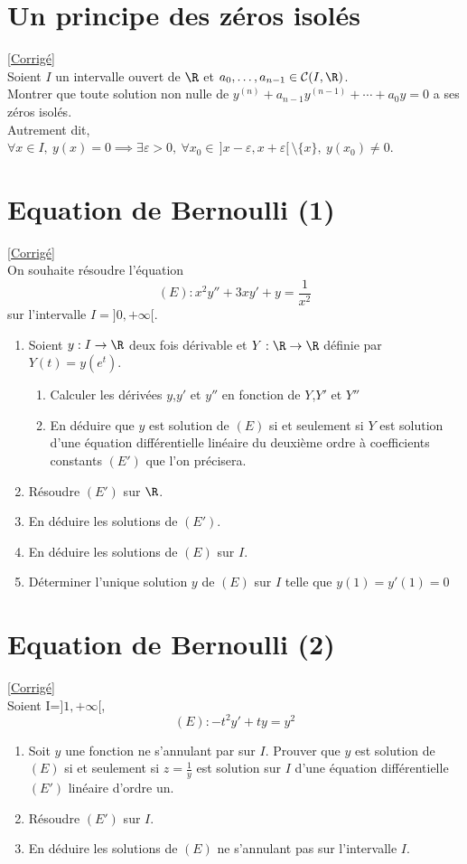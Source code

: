 \documentclass{book}
\begin{document}
\section{Un principe des zéros isolés }
\textcolor{blue}{\hyperref[Un principe des zéros isolés corrigé]{[Corrigé]}}\\
\label{Un principe des zéros isolés}
Soient $I$ un intervalle ouvert de $\R$ et $a_0,\dots,a_{n-1}\in \mathcal C(I,\R)$.\\
Montrer que toute solution non nulle de $y^{(n)}+a_{n-1}y^{(n-1)}+\cdots+a_0y=0$ a ses zéros isolés.\\
Autrement dit, $\forall x\in I,\ y(x)=0\implies \exists \varepsilon>0,\ \forall x_0\in\, ]x-\varepsilon,x+\varepsilon[\,\setminus\{x\},\ y(x_0)\ne 0$.

\section{Equation de Bernoulli (1)}
\textcolor{blue}{\hyperref[sec:equation-de-bernoulli-1]{[Corrigé]}}\\
\label{Equation de Bernoulli 1}
On souhaite résoudre l'équation $$(E):x^2y''+3xy'+y=\frac{1}{x^2}$$ sur l'intervalle $I=]0,+\infty[$.
\begin{enumerate}
	\item Soient $y:I\to\R$ deux fois dérivable  et $Y:\R\to\R$ définie par $Y(t)=y(e^t)$.
	\begin{enumerate}[label=\alph*]
		\item Calculer les dérivées $y$,$y'$ et $y''$ en fonction de $Y$,$Y'$ et $Y''$
		\item En déduire que $y$ est solution de $(E)$ si et seulement si $Y$ est solution d'une équation différentielle linéaire du deuxième ordre à coefficients constants $(E')$ que l'on précisera.
	\end{enumerate}
	\item Résoudre $(E')$ sur $\R$.
	\item En déduire les solutions de $(E')$.
	\item En déduire les solutions de $(E)$ sur $I$.
	\item Déterminer l'unique solution $y$ de $(E)$ sur $I$ telle que $y(1)=y'(1)=0$
\end{enumerate}

\section{Equation de Bernoulli (2)}
\textcolor{blue}{\hyperref[sec:equation-de-bernoulli-2]{[Corrigé]}}\\
\label{Equation de Bernoulli (2)}
Soient I=$]1,+\infty[$, $$(E): -t^2y'+ty=y^2$$
\begin{enumerate}
	\item Soit $y$ une fonction ne s'annulant par sur $I$. Prouver que $y$ est solution de $(E)$ si et seulement si $z=\displaystyle\frac{1}{y}$ est solution sur $I$ d'une équation différentielle $(E')$ linéaire d'ordre un.
	\item Résoudre $(E')$ sur $I$.
	\item En déduire les solutions de $(E)$ ne s'annulant pas sur l'intervalle $I$.
\end{enumerate}
\end{document}
